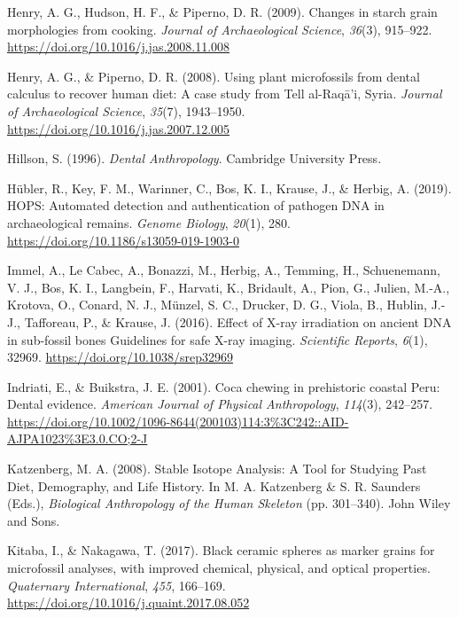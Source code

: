 \documentclass[
  b5paper,
]{book}
\newlength{\cslhangindent}
\newenvironment{CSLReferences}[2] %
 {\begin{list}{}{%
  \setlength{\itemindent}{0pt}
  \setlength{\leftmargin}{0pt}
  \setlength{\parsep}{0pt}
  \ifodd #1
   \setlength{\leftmargin}{\cslhangindent}
   \setlength{\itemindent}{-1\cslhangindent}
  \fi
  \setlength{\itemsep}{#2\baselineskip}}}
 {\end{list}}
\begin{document}
\begin{CSLReferences}{1}{0}
Henry, A. G., Hudson, H. F., \& Piperno, D. R. (2009). Changes in starch
grain morphologies from cooking. \emph{Journal of Archaeological
Science}, \emph{36}(3), 915--922.
\url{https://doi.org/10.1016/j.jas.2008.11.008}

Henry, A. G., \& Piperno, D. R. (2008). Using plant microfossils from
dental calculus to recover human diet: A case study from {Tell}
al-{Raqā}'i, {Syria}. \emph{Journal of Archaeological Science},
\emph{35}(7), 1943--1950.
\url{https://doi.org/10.1016/j.jas.2007.12.005}

Hillson, S. (1996). \emph{Dental {Anthropology}}. {Cambridge University
Press}.

Hübler, R., Key, F. M., Warinner, C., Bos, K. I., Krause, J., \& Herbig,
A. (2019). {HOPS}: Automated detection and authentication of pathogen
{DNA} in archaeological remains. \emph{Genome Biology}, \emph{20}(1),
280. \url{https://doi.org/10.1186/s13059-019-1903-0}

Immel, A., Le Cabec, A., Bonazzi, M., Herbig, A., Temming, H.,
Schuenemann, V. J., Bos, K. I., Langbein, F., Harvati, K., Bridault, A.,
Pion, G., Julien, M.-A., Krotova, O., Conard, N. J., Münzel, S. C.,
Drucker, D. G., Viola, B., Hublin, J.-J., Tafforeau, P., \& Krause, J.
(2016). Effect of {X-ray} irradiation on ancient {DNA} in sub-fossil
bones \textendash{} {Guidelines} for safe {X-ray} imaging.
\emph{Scientific Reports}, \emph{6}(1), 32969.
\url{https://doi.org/10.1038/srep32969}

Indriati, E., \& Buikstra, J. E. (2001). Coca chewing in prehistoric
coastal {Peru}: {Dental} evidence. \emph{American Journal of Physical
Anthropology}, \emph{114}(3), 242--257.
\url{https://doi.org/10.1002/1096-8644(200103)114:3\%3C242::AID-AJPA1023\%3E3.0.CO;2-J}

Katzenberg, M. A. (2008). Stable {Isotope Analysis}: {A Tool} for
{Studying Past Diet}, {Demography}, and {Life History}. In M. A.
Katzenberg \& S. R. Saunders (Eds.), \emph{Biological {Anthropology} of
the {Human Skeleton}} (pp. 301--340). {John Wiley and Sons}.

Kitaba, I., \& Nakagawa, T. (2017). Black ceramic spheres as marker
grains for microfossil analyses, with improved chemical, physical, and
optical properties. \emph{Quaternary International}, \emph{455},
166--169. \url{https://doi.org/10.1016/j.quaint.2017.08.052}


\end{CSLReferences}
\end{document}
